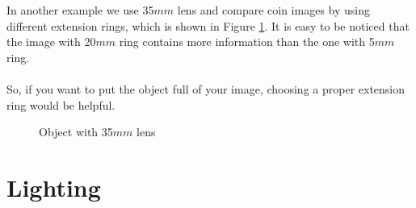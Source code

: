 \documentclass[english]{article}
\begin{document}
In another example we use 35$mm$ lens and compare coin images by using different extension rings, which is shown in Figure \ref{fig:three}.
It is easy to be noticed that the image with 20$mm$ ring contains more information than the one with 5$mm$ ring.\\
\\
So, if you want to put the object full of your image, choosing a proper extension ring would be helpful.
\begin{figure}[H]
	\centering
	\caption{Object with 35$mm$ lens}
	\label{fig:three}
\end{figure}

\section{Lighting}
\end{document}
